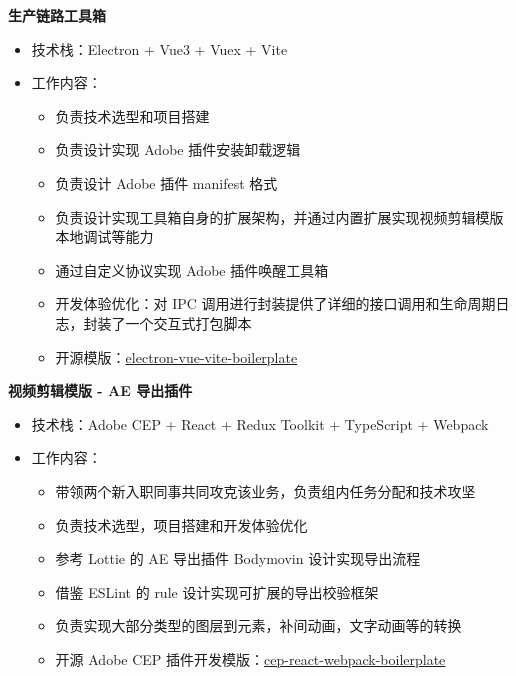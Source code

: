 \textbf{生产链路工具箱}

\vspace{10pt}

\begin{itemize}
\item 技术栈：Electron + Vue3 + Vuex + Vite
\item 工作内容：
  \begin{itemize}
    \item 负责技术选型和项目搭建
    \item 负责设计实现 Adobe 插件安装卸载逻辑
    \item 负责设计 Adobe 插件 manifest 格式
    \item 负责设计实现工具箱自身的扩展架构，并通过内置扩展实现视频剪辑模版本地调试等能力
    \item 通过自定义协议实现 Adobe 插件唤醒工具箱
    \item 开发体验优化：对 IPC 调用进行封装提供了详细的接口调用和生命周期日志，封装了一个交互式打包脚本
    \item 开源模版：\href{https://github.com/tjx666/electron-vue-vite-boilerplate}{electron-vue-vite-boilerplate}
  \end{itemize}
\end{itemize}

\textbf{视频剪辑模版 - AE 导出插件}

\vspace{10pt}

\begin{itemize}
\item 技术栈：Adobe CEP + React + Redux Toolkit + TypeScript + Webpack
\item 工作内容：
  \begin{itemize}
    \item 带领两个新入职同事共同攻克该业务，负责组内任务分配和技术攻坚
    \item 负责技术选型，项目搭建和开发体验优化
    \item 参考 Lottie 的 AE 导出插件 Bodymovin 设计实现导出流程
    \item 借鉴 ESLint 的 rule 设计实现可扩展的导出校验框架
    \item 负责实现大部分类型的图层到元素，补间动画，文字动画等的转换
    \item 开源 Adobe CEP 插件开发模版：\href{https://github.com/tjx666/cep-react-webpack-boilerplate}{cep-react-webpack-boilerplate}
  \end{itemize}
\end{itemize}

